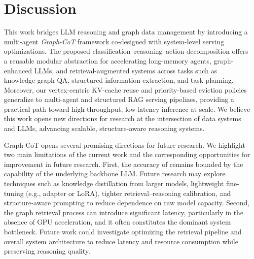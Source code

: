 \section{Discussion}


This work bridges LLM reasoning and graph data management by introducing a multi-agent \textit{Graph-CoT} framework co-designed with system-level serving optimizations. The proposed classification–reasoning–action decomposition offers a reusable modular abstraction for accelerating long-memory agents\cite{zhang2025survey}, graph-enhanced LLMs\cite{liu2024knowledge}, and retrieval-augmented systems\cite{peng2024graph} across tasks such as knowledge-graph QA, structured information extraction, and task planning. Moreover, our vertex-centric KV-cache reuse and priority-based eviction policies generalize to multi-agent and structured RAG serving pipelines, providing a practical path toward high-throughput, low-latency inference at scale. We believe this work opens new directions for research at the intersection of data systems and LLMs, advancing scalable, structure-aware reasoning systems.



Graph-CoT opens several promising directions for future research. We highlight two main limitations of the current work and the corresponding opportunities for improvement in future research.  
First, the accuracy of \projectname{} remains bounded by the capability of the underlying backbone LLM. Future research may explore techniques such as knowledge distillation from larger models, lightweight fine-tuning (e.g., adapter or LoRA), tighter retrieval–reasoning calibration, and structure-aware prompting to reduce dependence on raw model capacity. 
Second, the graph retrieval process can introduce significant latency, particularly in the absence of GPU acceleration, and it often constitutes the dominant system bottleneck. Future work could investigate optimizing the retrieval pipeline and overall system architecture to reduce latency and resource consumption while preserving reasoning quality.



